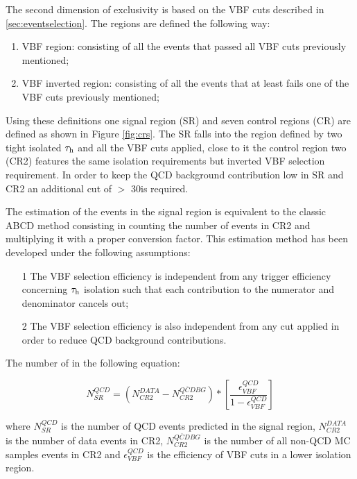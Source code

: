 The second dimension of exclusivity is based on the VBF cuts described in \ref{sec:eventselection}. The regions are defined the following way:
	
	\begin{enumerate}
		\item VBF region: consisting of all the events that passed all VBF cuts previously mentioned;
		\item VBF inverted region: consisting of all the events that at least fails one of the VBF cuts previously mentioned;
	\end{enumerate} 

Using these definitions one signal region (SR) and seven control regions (CR) are defined as shown in Figure \ref{fig:crs}. The SR falls into the region defined by two tight isolated $\tau_{\text{h}}$ and all the VBF cuts applied, close to it the control region two (CR2) features the same \hadtau isolation requirements but inverted VBF selection requirement. In order to keep the QCD background contribution low in SR and CR2 an additional cut of  \met $ > $ 30\gev is required.

The estimation of the events in the signal region is equivalent to the classic ABCD method consisting in counting the number of events in CR2 and multiplying it with a proper conversion factor. This estimation method has been developed under the following assumptions:

\begin{itemize}
	\item[1] The VBF selection efficiency is independent from any trigger efficiency concerning $\tau_{\text{h}}$ isolation such that each contribution to the numerator and denominator cancels out;
	\item[2] The VBF selection efficiency is also independent from any \met cut applied in order to reduce QCD background contributions. 
\end{itemize}

 The number of   in the following equation:

\begin{equation}
N^{QCD}_{SR} = \left( N^{DATA}_{CR2} - N^{\overline{QCD} BG}_{CR2} \right) * \left[ \frac{\epsilon^{QCD}_{VBF}}{1 - \epsilon^{QCD}_{VBF}} \right]
\label{eq:qcdbgpred}
\end{equation}

where $N^{QCD}_{SR}$ is the number of QCD events predicted in the signal region, $N^{DATA}_{CR2}$ is the number of data events in CR2, $N^{\overline{QCD} BG}_{CR2}$ is the number of all non-QCD MC samples events in CR2 and $\epsilon^{QCD}_{VBF}$ is the efficiency of VBF cuts in a lower \hadtau isolation region. 

